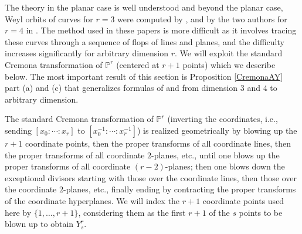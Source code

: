 \documentclass[12pt]{article}
\numberwithin{equation}{section}
\numberwithin{subeq}{equation}
\def\bbP{\mathbb{P}}
\begin{document}
The theory in the planar case is well understood
and beyond the planar case,
Weyl orbits of curves for $r=3$ were computed by \cite{LU},
and by the two authors for $r=4$ in \cite{DM1}.
The method used in these papers is more difficult
as it involves tracing these curves through a sequence of flops of lines and planes,
and the difficulty increases significantly for arbitrary dimension $r$.
We will exploit the standard Cremona transformation of $\bbP^r$ (centered at $r+1$ points) which we describe below.
The most important result of this section is Proposition \ref{CremonaAY} part (a) and (c) 
that generalizes formulas of \cite{LU} and \cite{DM1} from dimension $3$ and $4$ 
to arbitrary dimension.

The standard Cremona transformation of $\bbP^r$
(inverting the coordinates,
i.e., sending $[x_0:\cdots:x_r]$ to $[x_0^{-1}:\cdots:x_r^{-1}]$)
is realized geometrically by blowing up the $r+1$ coordinate points,
then the proper transforms of all coordinate lines, 
then the proper transforms of all coordinate $2$-planes, etc., until one blows up 
the proper transforms of all coordinate $(r-2)$-planes;
then one blows down the exceptional divisors starting with those over the coordinate lines,
then those over the coordinate $2$-planes, etc.,
finally ending by contracting the proper transforms of the coordinate hyperplanes.
We will index the $r+1$ coordinate points used here by $\{1,\ldots,r+1\}$,
considering them as the first $r+1$ of the $s$ points to be blown up to obtain $Y^r_s$.
\end{document}

